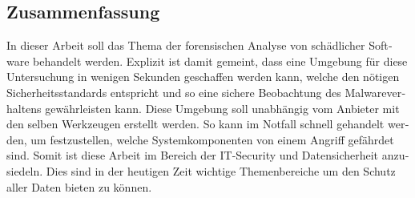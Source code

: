 \newpage
\begin{otherlanguage}{ngerman}
\section*{Zusammenfassung}

In dieser Arbeit soll das Thema der forensischen Analyse von schädlicher Software behandelt werden. Explizit ist damit gemeint, dass eine Umgebung für diese Untersuchung in wenigen Sekunden geschaffen werden kann, welche den nötigen Sicherheitsstandards entspricht und so eine sichere Beobachtung des Malwareverhaltens gewährleisten kann. Diese Umgebung soll unabhängig vom Anbieter mit den selben Werkzeugen erstellt werden. So kann im Notfall schnell gehandelt werden, um festzustellen, welche Systemkomponenten von einem Angriff gefährdet sind.
\newline Somit ist diese Arbeit im Bereich der IT-Security und Datensicherheit anzusiedeln. Dies sind in der heutigen Zeit wichtige Themenbereiche um den Schutz aller Daten bieten zu können.
\end{otherlanguage}